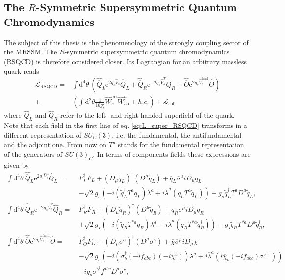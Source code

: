 \subsection{The $R$-Symmetric Supersymmetric Quantum Chromodynamics}
The subject of this thesis is the phenomenology of the strongly coupling sector of the MRSSM. The $R$-symmetric supersymmetric quantum chromodynamics (RSQCD) is therefore considered closer. Its Lagrangian for an arbitrary massless quark reads
\begin{align}
\mathcal{L}_{\mathrm{RSQCD}} = &\int\mathrm{d}^4\theta\ \left( \hat{\overline{Q}}_L \mathrm{e}^{2g_s\hat{V}_s} \hat{Q}_L + \hat{\overline{Q}}_R \mathrm{e}^{-2g_s\hat{V}^T_s} \hat{Q}_R + \hat{\overline{O}} \mathrm{e}^{2g_s\hat{V}^{\mathrm{fund}}_s} \hat{O}\right)\nonumber\\
+& \left( \int \mathrm{d}^2\theta \frac{1}{16g_s^2} \hat{W}_s^{a\alpha}\hat{W}^a_{s\alpha} + h.c. \right) + \mathcal{L}_{\mathrm{soft}}\label{eq:L_super_RSQCD}
\end{align}
where $\hat{Q}_L$ and $\hat{Q}_R$ refer to the left- and right-handed superfield of the quark. Note that each field in the first line of eq. \eqref{eq:L_super_RSQCD} transforms in a different representation of $SU_C(3)$, i.e. the fundamental, the antifundamental and the adjoint one. From now on $T^a$ stands for the fundamental representation of the generators of $SU(3)_C$. In terms of components fields these expressions are given by
\begin{align}
\int\mathrm{d}^4\theta\ \hat{\overline{Q}}_L \mathrm{e}^{2g_s\hat{V}_s} \hat{Q}_L =\ & F_L^\dagger F_L + (D_\mu \tilde{q}_L)^\dagger (D^\mu \tilde{q}_L) + \overline{q}_L \overline{\sigma}^\mu i D_\mu q_L\nonumber\\
&-\sqrt{2}g_s \left( -i (\tilde{q}_L^\dagger T^a q_L ) \lambda^a + i \overline{\lambda}^a (\overline{q}_L T^a \tilde{q}_L) \right) + g_s\tilde{q}_L^\dagger T^a D^a \tilde{q}_L,\label{eq:RSQCD_Feynmanrules1}\\
\int\mathrm{d}^4\theta\ \hat{\overline{Q}}_R \mathrm{e}^{-2g_s\hat{V}^T_s} \hat{Q}_R =\  & F_R^\dagger F_R + (D_\mu \tilde{q}_R)^\dagger (D^\mu \tilde{q}_R) + \overline{q}_R \overline{\sigma}^\mu i D_\mu q_R\nonumber\\
&+\sqrt{2}g_s \left( -i (\tilde{q}_R T^{\ast a} q_R ) \lambda^a + i \overline{\lambda}^a (\overline{q}_R T^{\ast a} \tilde{q}_R^\dagger) \right) - g_s \tilde{q}_R T^{\ast a} D^a \tilde{q}_R^\dagger,\label{eq:RSQCD_Feynmanrules2}\\
\int\mathrm{d}^4\theta\ \hat{\overline{O}} \mathrm{e}^{2g_s\hat{V}^{\mathrm{fund}}_s} \hat{O} =\  & F_O^\dagger F_O + (D_\mu \sigma^a)^\dagger (D^\mu \sigma^a) + \overline{\chi} \overline{\sigma}^\mu i D_\mu \chi\nonumber\\
&-\sqrt{2}g_s \left( -i (\sigma_b^\dagger (-if_{abc}) (-i\chi^c) ) \lambda^a + i \overline{\lambda}^a (i\overline{\chi}_b (+if_{abc}) \sigma^{c\dagger}) \right)\nonumber\\
&-ig_s\sigma^{b^\dagger} f^{abc}D^a\sigma^c,
\end{align}
